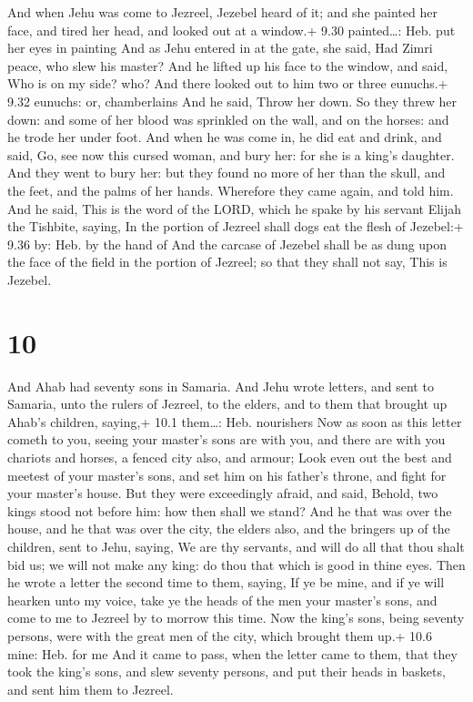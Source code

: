  And when Jehu was come to Jezreel, Jezebel heard of it;
and she painted her face, and tired her head, and looked out at a
window.+ 9.30 painted\ldots: Heb. put her eyes in painting 
And as Jehu entered in at the gate, she said, Had Zimri peace, who slew
his master?  And he lifted up his face to the window, and
said, Who is on my side? who? And there looked out to him two or three
eunuchs.+ 9.32 eunuchs: or, chamberlains  And he said,
Throw her down. So they threw her down: and some of her blood was
sprinkled on the wall, and on the horses: and he trode her under foot.
 And when he was come in, he did eat and drink, and said,
Go, see now this cursed woman, and bury her: for she is a king's
daughter.  And they went to bury her: but they found no
more of her than the skull, and the feet, and the palms of her hands.
 Wherefore they came again, and told him. And he said, This
is the word of the LORD, which he spake by his servant Elijah the
Tishbite, saying, In the portion of Jezreel shall dogs eat the flesh of
Jezebel:+ 9.36 by: Heb. by the hand of  And the carcase of
Jezebel shall be as dung upon the face of the field in the portion of
Jezreel; so that they shall not say, This is Jezebel.

\hypertarget{section-9}{%
\section{10}\label{section-9}}

 And Ahab had seventy sons in Samaria. And Jehu wrote
letters, and sent to Samaria, unto the rulers of Jezreel, to the elders,
and to them that brought up Ahab's children, saying,+ 10.1 them\ldots:
Heb. nourishers  Now as soon as this letter cometh to you,
seeing your master's sons are with you, and there are with you chariots
and horses, a fenced city also, and armour;  Look even out
the best and meetest of your master's sons, and set him on his father's
throne, and fight for your master's house.  But they were
exceedingly afraid, and said, Behold, two kings stood not before him:
how then shall we stand?  And he that was over the house,
and he that was over the city, the elders also, and the bringers up of
the children, sent to Jehu, saying, We are thy servants, and will do all
that thou shalt bid us; we will not make any king: do thou that which is
good in thine eyes.  Then he wrote a letter the second time
to them, saying, If ye be mine, and if ye will hearken unto my voice,
take ye the heads of the men your master's sons, and come to me to
Jezreel by to morrow this time. Now the king's sons, being seventy
persons, were with the great men of the city, which brought them up.+
10.6 mine: Heb. for me  And it came to pass, when the letter
came to them, that they took the king's sons, and slew seventy persons,
and put their heads in baskets, and sent him them to Jezreel.


